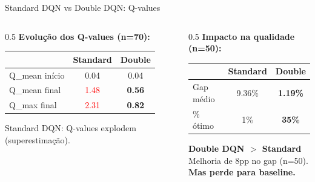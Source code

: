 \documentclass[11pt, xcolor=dvipsnames]{beamer}
\newcommand{\destaque}[1]{\textbf{\textcolor{verde}{#1}}}
\begin{document}
\begin{frame}{Standard DQN vs Double DQN: Q-values}
  \footnotesize
  \begin{columns}[T]
    \begin{column}{0.5\textwidth}
      \textbf{Evolução dos Q-values (n=70):}
      \vspace{2mm}

      \centering
      \renewcommand{\arraystretch}{1.2}
      \begin{tabular}{lcc}
        \toprule
        & \textbf{Standard} & \textbf{Double} \\
        \midrule
        Q\_mean início & 0.04 & 0.04 \\
        Q\_mean final & \textcolor{red}{1.48} & \destaque{0.56} \\
        Q\_max final & \textcolor{red}{2.31} & \destaque{0.82} \\
        \bottomrule
      \end{tabular}

      \vspace{3mm}
      {\scriptsize Standard DQN: Q-values explodem (superestimação).}
    \end{column}
    \begin{column}{0.5\textwidth}
      \textbf{Impacto na qualidade (n=50):}
      \vspace{2mm}

      \centering
      \renewcommand{\arraystretch}{1.2}
      \begin{tabular}{lcc}
        \toprule
        & \textbf{Standard} & \textbf{Double} \\
        \midrule
        Gap médio & 9.36\% & \destaque{1.19\%} \\
        \% ótimo & 1\% & \destaque{35\%} \\
        \bottomrule
      \end{tabular}

      \vspace{3mm}
      \begin{calloutbox}
        {\scriptsize
        \textbf{Double DQN $>$ Standard} \\
        Melhoria de 8pp no gap (n=50). \\
        \textbf{Mas perde para baseline.}
        }
      \end{calloutbox}
    \end{column}
  \end{columns}
\end{frame}
\end{document}
